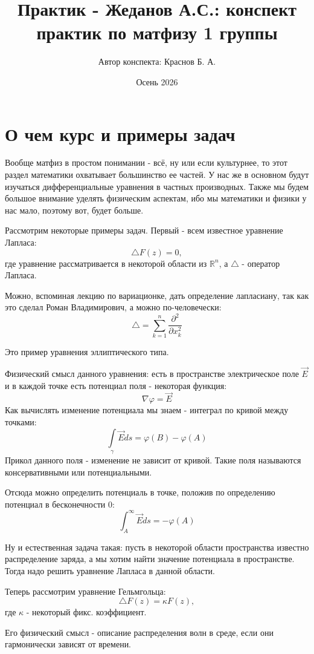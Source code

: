 \documentclass[12pt,a4paper]{article} %
\author{Автор конспекта: Краснов Б. А.} %
\title{Практик - Жеданов А.С.: конспект практик по матфизу 1 группы} %
\date{Осень 2026} %
\newcommand{\R}{\mathbb{R}}
\begin{document}
	\maketitle
	\tableofcontents
	\clearpage
	
	\section{О чем курс и примеры задач}
	Вообще матфиз в простом понимании - всё, ну или если культурнее, то этот раздел математики охватывает большинство ее частей. У нас же в основном будут изучаться дифференциальные уравнения в частных производных. Также мы будем большое внимание уделять физическим аспектам, ибо мы математики и физики у нас мало, поэтому вот, будет больше.
	
	Рассмотрим некоторые примеры задач. Первый - всем известное уравнение Лапласа:
	$$\triangle F(z)=0,$$
	где уравнение рассматривается в некоторой области из $\R^n$, а $\triangle$ - оператор Лапласа.
	
	Можно, вспоминая лекцию по вариационке, дать определение лапласиану, так как это сделал Роман Владимирович, а можно по-человечески:
	$$\triangle=\sum_{k=1}^n\frac{\partial^2}{\partial x_k^2}$$
	
	Это пример уравнения эллиптического типа.
	
	Физический смысл данного уравнения: есть в пространстве электрическое поле $\overrightarrow{E}$ и в каждой точке есть потенциал поля - некоторая функция:
	$$\nabla\varphi=\overrightarrow{E}$$
	Как вычислять изменение потенциала мы знаем - интеграл по кривой между точками:
	$$\int\limits_{\gamma}\overrightarrow{E}ds=\varphi(B)-\varphi(A)$$
	Прикол данного поля - изменение не зависит от кривой. Такие поля называются консервативными или потенциальными.
	
	Отсюда можно определить потенциаль в точке, положив по определению потенциал в бесконечности 0:
	$$\int_A^{\infty}\overrightarrow{E}ds=-\varphi(A)$$
	
	Ну и естественная задача такая: пусть в некоторой области пространства известно распределение заряда, а мы хотим найти значение потенциала в пространстве. Тогда надо решить уравнение Лапласа в данной области.
	
	Теперь рассмотрим уравнение Гельмгольца:
	$$\triangle F(z)=\kappa F(z),$$
	где $\kappa$ - некоторый фикс. коэффициент.
	
	Его физический смысл - описание распределения волн в среде, если они гармонически зависят от времени.
	
\end{document}

